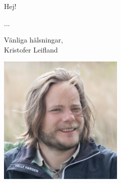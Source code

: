 \documentclass{letter}
\begin{document}
\begin{letter}{}
\opening{Hej!}

...

Vänliga hälsningar,\\
Kristofer Leifland

\centering
\includegraphics[width=60mm]{me.jpg}


\end{letter}
\end{document}
